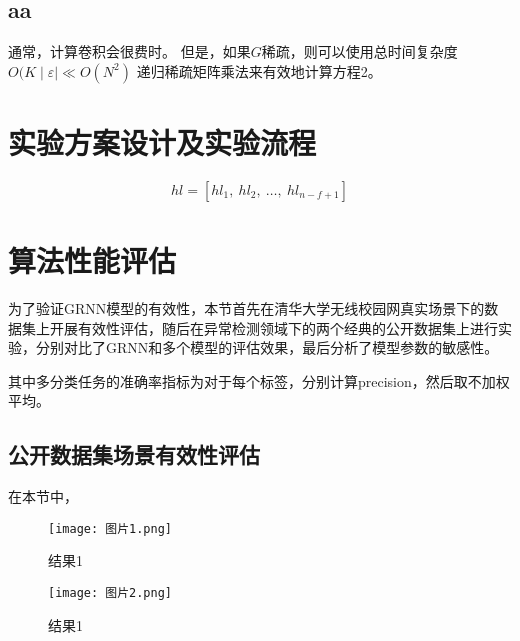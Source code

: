 \subsection{aa}
通常，计算卷积会很费时。 但是，如果$G$稀疏，则可以使用总时间复杂度 $O(K \mid \varepsilon \mid \ll O(N^ 2)$ 递归稀疏矩阵乘法来有效地计算方程2。


\section{实验方案设计及实验流程}
\begin{equation*} hl=[hl_{1},\ hl_{2},\ \ldots,\ hl_{n-f+1}] \tag{-} \end{equation*}

\section{算法性能评估}
为了验证GRNN模型的有效性，本节首先在清华大学无线校园网真实场景下的数据集上开展有效性评估，随后在异常检测领域下的两个经典的公开数据集上进行实验，分别对比了GRNN和多个模型的评估效果，最后分析了模型参数的敏感性。

其中多分类任务的准确率指标为对于每个标签，分别计算precision，然后取不加权平均。
\subsection{公开数据集场景有效性评估}
在本节中，

\begin{figure}
    \centering
    \texttt{[image: 图片1.png]}
    \caption{结果1}
    \label{fig:example}
  \end{figure}

  \begin{figure}
    \centering
    \texttt{[image: 图片2.png]}
    \caption{结果1}
    \label{fig:example}
  \end{figure}


